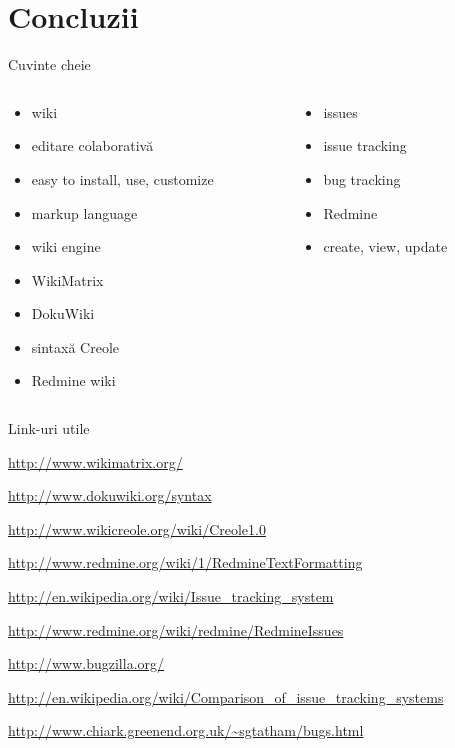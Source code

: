 \documentclass{beamer}
\begin{document}
\section{Concluzii}

\begin{frame}{Cuvinte cheie}
  \begin{columns}
    \begin{column}[l]{0.5\textwidth}
      \begin{itemize}
        \item wiki
        \item editare colaborativă
        \item easy to install, use, customize
        \item markup language
        \item wiki engine
        \item WikiMatrix
        \item DokuWiki
        \item sintaxă Creole
        \item Redmine wiki
      \end{itemize}
    \end{column}
    \begin{column}[l]{0.5\textwidth}
      \begin{itemize}
        \item issues
        \item issue tracking
        \item bug tracking
        \item Redmine
        \item create, view, update
      \end{itemize}
    \end{column}
  \end{columns}
\end{frame}

\begin{frame}{Link-uri utile}
  \begin{itemize}
    {\footnotesize
    \item \url{http://www.wikimatrix.org/}
    \item \url{http://www.dokuwiki.org/syntax}
    \item \url{http://www.wikicreole.org/wiki/Creole1.0}
    \item \url{http://www.redmine.org/wiki/1/RedmineTextFormatting}
    \item \url{http://en.wikipedia.org/wiki/Issue\_tracking\_system}
    \item \url{http://www.redmine.org/wiki/redmine/RedmineIssues}
    \item \url{http://www.bugzilla.org/}
    \item
\url{http://en.wikipedia.org/wiki/Comparison\_of\_issue\_tracking\_systems}
    \item \url{http://www.chiark.greenend.org.uk/~sgtatham/bugs.html}
    }
  \end{itemize}
\end{frame}
\end{document}
